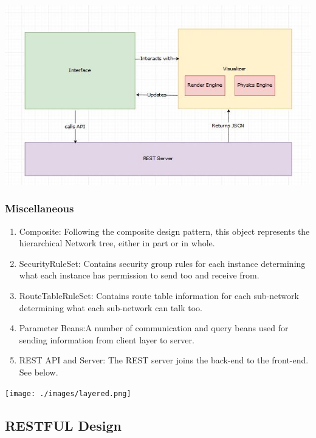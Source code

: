 \documentclass[hidelinks,a4paper,12pt]{article}
\begin{document}
\includegraphics[width=1.00\textwidth]{./images/visualizer.jpg}\\[0.4cm] 


\subsubsection{Miscellaneous }
\begin{enumerate} 
\item Composite: Following the composite design pattern, this object represents the hierarchical Network tree, either in part or in whole. 
\item SecurityRuleSet: Contains security group rules for each instance determining what each instance  has permission to send too and receive from.
\item RouteTableRuleSet: Contains route table information for each sub-network determining what each sub-network can talk too.
\item Parameter Beans:A number of communication and query beans used for sending information from client layer to server.
\item REST API and Server: The REST server joins the back-end to the front-end. See below.
\end{enumerate}

\texttt{[image: ./images/layered.png]}\\[0.4cm] 

\subsection{RESTFUL Design}
\end{document}
